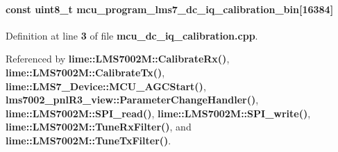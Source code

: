 \paragraph[{mcu\+\_\+program\+\_\+lms7\+\_\+dc\+\_\+iq\+\_\+calibration\+\_\+bin}]{\setlength{\rightskip}{0pt plus 5cm}const uint8\+\_\+t mcu\+\_\+program\+\_\+lms7\+\_\+dc\+\_\+iq\+\_\+calibration\+\_\+bin[16384]}\label{mcu__dc__iq__calibration_8cpp_ae546700db7d63379a509565474979c6c}


Definition at line {\bf 3} of file {\bf mcu\+\_\+dc\+\_\+iq\+\_\+calibration.\+cpp}.



Referenced by {\bf lime\+::\+L\+M\+S7002\+M\+::\+Calibrate\+Rx()}, {\bf lime\+::\+L\+M\+S7002\+M\+::\+Calibrate\+Tx()}, {\bf lime\+::\+L\+M\+S7\+\_\+\+Device\+::\+M\+C\+U\+\_\+\+A\+G\+C\+Start()}, {\bf lms7002\+\_\+pnl\+R3\+\_\+view\+::\+Parameter\+Change\+Handler()}, {\bf lime\+::\+L\+M\+S7002\+M\+::\+S\+P\+I\+\_\+read()}, {\bf lime\+::\+L\+M\+S7002\+M\+::\+S\+P\+I\+\_\+write()}, {\bf lime\+::\+L\+M\+S7002\+M\+::\+Tune\+Rx\+Filter()}, and {\bf lime\+::\+L\+M\+S7002\+M\+::\+Tune\+Tx\+Filter()}.

